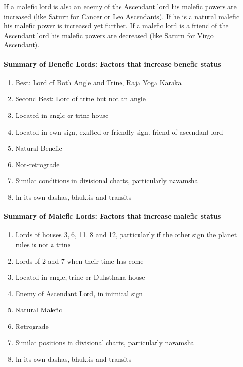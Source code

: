  

If a malefic lord is also an enemy of the Ascendant lord his malefic powers are increased (like Saturn for Cancer or Leo Ascendants). If he is a natural malefic his malefic power is increased yet further. If a malefic lord is a friend of the Ascendant lord his malefic powers are decreased (like Saturn for Virgo Ascendant).

 

\paragraph{Summary of Benefic Lords: Factors that increase benefic status}

 
\begin{enumerate}
\item Best: Lord of Both Angle and Trine, Raja Yoga Karaka
\item Second Best: Lord of trine but not an angle
\item Located in angle or trine house
\item Located in own sign, exalted or friendly sign, friend of ascendant lord
\item Natural Benefic
\item Not-retrograde
\item Similar conditions in divisional charts, particularly navamsha
\item In its own dashas, bhuktis and transits
\end{enumerate}

\paragraph{Summary of Malefic Lords: Factors that increase malefic status}

 
\begin{enumerate}
\item Lords of houses 3, 6, 11, 8 and 12, particularly if the other sign the planet rules is not a trine
\item Lords of 2 and 7 when their time has come
\item Located in angle, trine or Duhsthana house
\item Enemy of Ascendant Lord, in inimical sign
\item Natural Malefic
\item Retrograde
\item Similar positions in divisional charts, particularly navamsha
\item In its own dashas, bhuktis and transits
 \end{enumerate}

